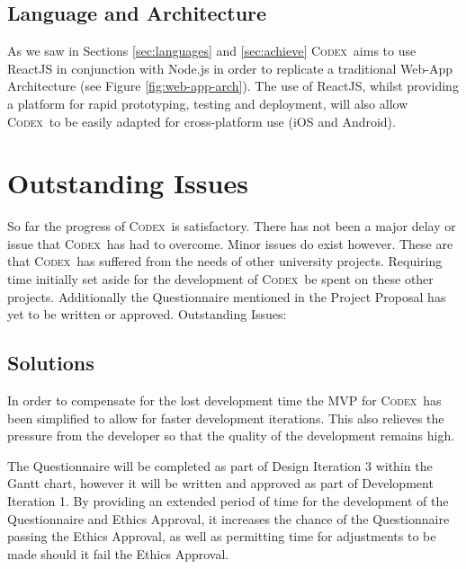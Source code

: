 \documentclass[progress]{cmpreport}
\newcommand{\Codex}{\textsc{Codex}}
\begin{document}
		\subsection{Language and Architecture} \label{sec:lang&arch}
		As we saw in Sections \ref{sec:languages} and \ref{sec:achieve} \Codex \ aims to use ReactJS in conjunction with Node.js in order to replicate a traditional Web-App Architecture (see Figure \ref{fig:web-app-arch}). The use of ReactJS, whilst providing a platform for rapid prototyping, testing and deployment, will also allow \Codex \ to be easily adapted for cross-platform use (iOS and Android). 
		
	\section{Outstanding Issues} \label{sec:Issues}
	So far the progress of \Codex \ is satisfactory. There has not been a major delay or issue that \Codex \ has had to overcome. Minor issues do exist however. These are that \Codex \ has suffered from the needs of other university projects. Requiring time initially set aside for the development of \Codex \ be spent on these other projects. Additionally the Questionnaire mentioned in the Project Proposal has yet to be written or approved. 
	Outstanding Issues:

		\subsection{Solutions} \label{sec:solutions}
		In order to compensate for the lost development time the MVP for \Codex \ has been simplified to allow for faster development iterations. This also relieves the pressure from the developer so that the quality of the development remains high.
		
		The Questionnaire will be completed as part of Design Iteration 3 within the Gantt chart, however it will be written and approved as part of Development Iteration 1. By providing an extended period of time for the development of the Questionnaire and Ethics Approval, it increases the chance of the Questionnaire passing the Ethics Approval, as well as permitting time for adjustments to be made should it fail the Ethics Approval.
		
\end{document}
